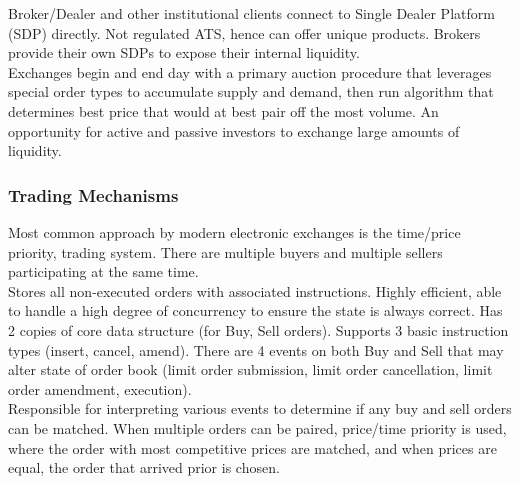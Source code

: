 Broker/Dealer and other institutional clients connect to Single Dealer Platform (SDP) directly. Not regulated ATS, hence can offer unique products. Brokers provide their own SDPs to expose their internal liquidity.\\

 Exchanges begin and end day with a primary auction procedure that leverages special order types to accumulate supply and demand, then run algorithm that determines best price that would at best pair off the most volume. An opportunity for active and passive investors to exchange large amounts of liquidity.

\subsubsection{Trading Mechanisms}

Most common approach by modern electronic exchanges is the time/price priority,  trading system. There are multiple buyers and multiple sellers participating at the same time.\\

 Stores all non-executed orders with associated instructions. Highly efficient, able to handle a high degree of concurrency to ensure the state is always correct. Has 2 copies of core data structure (for Buy, Sell orders). Supports 3 basic instruction types (insert, cancel, amend). There are 4 events on both Buy and Sell that may alter state of order book (limit order submission, limit order cancellation, limit order amendment, execution).\\

 Responsible for interpreting various events to determine if any buy and sell orders can be matched. When multiple orders can be paired, price/time priority is used, where the order with most competitive prices are matched, and when prices are equal, the order that arrived prior is chosen.\\

